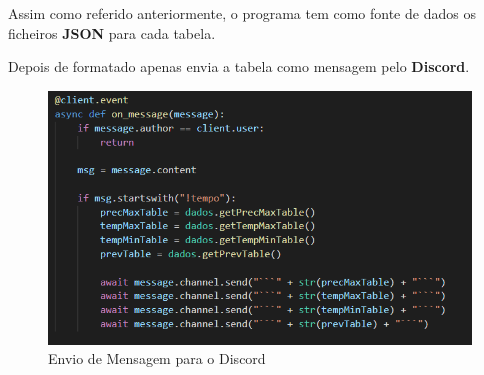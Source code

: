 Assim como referido anteriormente, o programa tem como fonte de dados os ficheiros \textbf{JSON} para cada tabela.
\newpage

Depois de formatado apenas envia a tabela como mensagem pelo \textbf{Discord}.

\begin{figure}[H]
    \centering
    \includegraphics[scale=0.7]{imagens/tabelassenddiscord.png}
    \caption{Envio de Mensagem para o Discord}
\end{figure}
